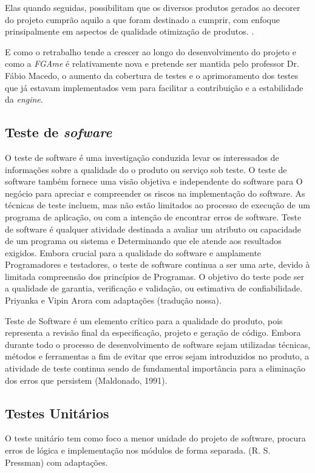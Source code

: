 Elas quando seguidas, possibilitam que os diversos produtos gerados ao decorer do projeto cumprão aquilo a que foram destinado a cumprir, com enfoque prinsipalmente em  aspectos de qualidade otimização de produtos.
.\cite{gregor}

E como o retrabalho tende a crescer ao longo do desenvolvimento do projeto e como a \textit{FGAme} é relativamente nova e pretende ser mantida pelo professor Dr. Fábio Macedo, o aumento da cobertura de testes e o aprimoramento dos testes que já estavam implementados vem para facilitar a contribuição e a estabilidade da \textit{engine}.


\subsection{Teste de \textit{sofware}}
O teste de software é uma investigação conduzida levar os interessados de informações sobre a qualidade do o produto ou serviço sob teste. 
O teste de software também fornece uma visão objetiva e independente do software para
O negócio para apreciar e compreender os riscos na implementação do software. 
As técnicas de teste incluem, mas não estão limitados ao processo de execução de um programa de aplicação, ou com a intenção de encontrar erros de software.
 Teste de software é qualquer atividade destinada a avaliar um atributo ou capacidade de um programa ou sistema e Determinando que ele atende aos resultados exigidos. 
Embora crucial para a qualidade do software e amplamente Programadores e testadores, o teste de software continua a ser uma arte, devido à limitada compreensão dos princípios de Programas. 
 O objetivo do teste pode ser a qualidade de garantia, verificação e validação, ou estimativa de confiabilidade. 
Priyanka e Vipin Arora  com adaptações (tradução nossa).

Teste de Software é um elemento crítico para a qualidade do produto, pois representa a revisão final da especificação, projeto e geração de código. Embora durante todo o processo de desenvolvimento de software sejam utilizadas técnicas, métodos e ferramentas a fim de evitar que erros sejam introduzidos no produto, a atividade de teste continua sendo de fundamental importância para a eliminação dos erros que persistem (Maldonado, 1991).

    \subsection{Testes Unitários}
        O teste unitário tem como foco a menor unidade do projeto de software, procura erros de lógica e implementação nos módulos de forma separada. (R. S. Pressman) com adaptações.

